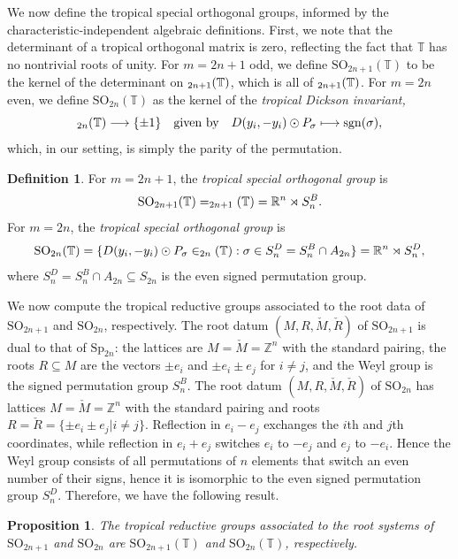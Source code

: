 \documentclass[10pt, a4paper]{amsart}
\newtheorem{proposition}[theorem]{Proposition}
\theoremstyle{definition}
\newtheorem{definition}[theorem]{Definition}
\theoremstyle{myitemstyle}
\newcommand{\Z}{\mathbb{Z}}
\newcommand{\RR}{\mathbb{R}}
\newcommand{\TT}{\mathbb{T}}
\newcommand{\T}{\mathbb{T}}
\newcommand{\Mcheck}{{\check{M}}}
\newcommand{\Rcheck}{\check{R}}
\DeclareMathOperator{\sgn}{sgn}
\newcommand{\Sp}{{\mathrm{Sp}}}
\newcommand{\SO}{{\mathrm{SO}}}
\let\O\relax
\DeclareMathOperator{\O}{O}
\begin{document}
We now define the tropical special orthogonal groups, informed by the characteristic-independent algebraic definitions. First, we note that the determinant of a tropical orthogonal matrix is zero, reflecting the fact that $\TT$ has no nontrivial roots of unity. For $m=2n+1$ odd, we define $\SO_{2n+1}(\T)$ to be the kernel of the determinant on $\O_{2n+1}(\TT)$, which is all of $\O_{2n+1}(\TT)$. For $m=2n$ even, we define $\SO_{2n}(\TT)$ as the kernel of the \emph{tropical Dickson invariant,}
\begin{equation*}
    \O_{2n}(\T) \longrightarrow \{\pm 1\}\quad \text{given by} \quad D(y_i,-y_i)\odot P_\sigma\longmapsto\sgn(\sigma),
\end{equation*}
which, in our setting, is simply the parity of the permutation.


\begin{definition} For $m=2n+1$, the \emph{tropical special orthogonal group} is
\[
\SO_{2n+1}(\TT)=\O_{2n+1}(\TT)=\RR^n\rtimes S_n^B.
\]
For $m=2n$, the \emph{tropical special orthogonal group} is
\[
\SO_{2n}(\TT)=\{D(y_i,-y_i)\odot P_\sigma\in \O_{2n}(\T):\sigma\in S_n^D=S_n^B\cap A_{2n}\}=\RR^n\rtimes S_n^D,
\]
where $S_n^D = S_n^B \cap A_{2n} \subseteq S_{2n}$ is the even signed permutation group.
    
\end{definition}


We now compute the tropical reductive groups associated to the root data of $\SO_{2n+1}$ and $\SO_{2n}$, respectively. The root datum $(M,R,\Mcheck,\Rcheck)$ of $\SO_{2n+1}$ is dual to that of $\Sp_{2n}$: the lattices are $M = \Mcheck = \Z^n$ with the standard pairing, the roots $R \subseteq M$ are the vectors $\pm e_i$ and $\pm e_i \pm e_j$ for $i \neq j$, and the Weyl group is the signed permutation group $S_n^B$. The root datum $(M,R,\Mcheck,\Rcheck)$ of $\SO_{2n}$ has lattices $M = \Mcheck = \Z^n$ with the standard pairing and roots $R = \Rcheck = \{\pm e_i \pm e_j| i \neq j\}$. Reflection in $e_i-e_j$ exchanges the $i$th and $j$th coordinates, while reflection in $e_i + e_j$ switches $e_i$ to $-e_j$ and $e_j$ to $-e_i$. Hence the Weyl group consists of all permutations of $n$ elements that switch an even number of their signs, hence it is isomorphic to the even signed permutation group $S^D_n$. Therefore, we have the following result.

\begin{proposition} The tropical reductive groups associated to the root systems of $\SO_{2n+1}$ and $\SO_{2n}$ are $\SO_{2n+1}(\TT)$ and $\SO_{2n}(\TT)$, respectively.
\label{prop:tropicalSO}
\end{proposition}
\end{document}
